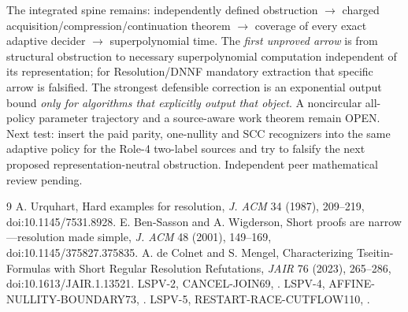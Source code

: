 \documentclass[11pt]{article}
\begin{document}
The integrated spine remains: independently defined obstruction $\to$ charged acquisition/compression/continuation theorem $\to$ coverage of every exact adaptive decider $\to$ superpolynomial time. The \emph{first unproved arrow} is from structural obstruction to necessary superpolynomial computation independent of its representation; for Resolution/DNNF mandatory extraction that specific arrow is falsified. The strongest defensible correction is an exponential output bound \emph{only for algorithms that explicitly output that object}. A noncircular all-policy parameter trajectory and a source-aware work theorem remain OPEN. Next test: insert the paid parity, one-nullity and SCC recognizers into the same adaptive policy for the Role-4 two-label sources and try to falsify the next proposed representation-neutral obstruction. Independent peer mathematical review pending.

\begin{thebibliography}{9}
 A. Urquhart, Hard examples for resolution, \emph{J. ACM} 34 (1987), 209--219, doi:10.1145/7531.8928.
 E. Ben-Sasson and A. Wigderson, Short proofs are narrow---resolution made simple, \emph{J. ACM} 48 (2001), 149--169, doi:10.1145/375827.375835.
 A. de Colnet and S. Mengel, Characterizing Tseitin-Formulas with Short Regular Resolution Refutations, \emph{JAIR} 76 (2023), 265--286, doi:10.1613/JAIR.1.13521.
 LSPV-2, CANCEL-JOIN69, .
 LSPV-4, AFFINE-NULLITY-BOUNDARY73, .
 LSPV-5, RESTART-RACE-CUTFLOW110, .
\end{thebibliography}
\end{document}

